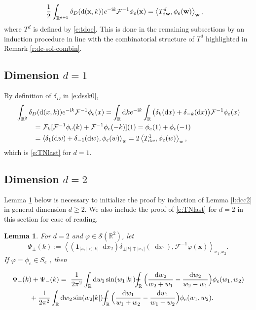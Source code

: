 \documentclass[11pt,A4,twoside]{article}
\newcommand\ind{\mathbf{1}}
\numberwithin{equation}{section}
\renewcommand{\vec}{\mathbf}
\newcommand{\intcc}{\dashint}
\newcommand{\F}{\mathcal{F}}
\newcommand{\Fi}{\mathcal{F}^{-1}}
\renewcommand*\d{\mathop{}\!\mathrm{d}}
\newcommand{\inner}[1]{\left\langle#1 \right\rangle}
\newcommand{\x}{\mathbf{x}}
\newcommand{\w}{\mathbf{w}}
\newcommand{\R}{\mathbbm{R}}
\renewcommand{\S}{\mathcal{S}}
\def\Phint#1{\mathchoice
  {\XXint\displaystyle\textstyle{#1}}%
  {\XXint\textstyle\scriptstyle{#1}}%
  {\XXint\scriptstyle\scriptscriptstyle{#1}}%
  {\XXint\scriptscriptstyle\scriptscriptstyle{#1}}%
  \!\int}
\def\XXint#1#2#3{{\setbox0=\hbox{$#1{#2#3}{\int}$}
    \vcenter{\hbox{$#2#3$}}\kern-.5\wd0}}
\def\dashint{\Phint-}
\def\qqq{\;\;\;\;\;\;\;\;\;}
\newcommand{\beqa}{\begin{eqnarray}}
\newcommand{\eeqa}{\end{eqnarray}}
\def\bal{\begin{aligned}}
\def\eal{\end{aligned}}
\def\bll#1{
\beqa\label{#1}\bal
}\def\lel{\eal\eeqa}
\newcommand{\beql}[1]{\bll{#1}}
\newcommand{\eeql}{\lel}
\newtheorem{lemma}[theorem]{Lemma}
\theoremstyle{definition}
\theoremstyle{remark}
\def\R{\mathbb{R}}
\def\varphie{\varphi_e}
\def\theS{D}
\def\thermi{{\rm i}}%
\begin{document}
{\def\varphie{\phi_e}\beql{e:TNlast}
        &\frac{1}{2}\int_{\R^{d+1}} \delta_\theS(\d(\vec x, k)) e^{-\thermi k} \Fi \varphie (\x) 
         =    \inner{T^d_{\d \w}, \varphie (\w)}_{\w},
         \eeql
where $T^d$ is defined by \eqref{e:tdoe}. 
This is done in the remaining subsections by an induction procedure in line with the combinatorial structure of $T^d$ highlighted in Remark \ref{r:dc-sol-combin}.

\subsection{Dimension $ d=1$}%


By definition of $ \delta_\theS$ in \eqref{e:dssk0},
{\def\varphie{\phi_e}\begin{align*}
    &\int_{\R^{2}} \delta_\theS(\d(  x, k)) e^{-\thermi k} \Fi \varphie ( x) 
     =  \int_{\R} \d k e^{-\thermi k}  \int_{\R}\big(\delta_{k}(\d x) + \delta_{-k}(\d x) \big)  \Fi \varphie(x)  \\
    &\qqq =\F_k[ \Fi \varphie(k) + \Fi \varphie(-k)](1) = \varphie(1) + \varphie(-1)\\
    &\qqq =\inner{\delta_1(\d w)+ \delta_{-1}(\d w),\varphie(w)}_{w} = 2\inner{T^1_{\d w}, \varphie (w)}_{w},
\end{align*}}
which is \eqref{e:TNlast} for $d=1$.



\subsection{Dimension $d=2$} 

Lemma \ref{lemma:fouri} below is necessary to initialize the proof by induction of Lemma \ref{l:dcc2} in general dimension $d\ge 2$.  We also include the proof of \eqref{e:TNlast} for $d=2$ in this section for ease of reading.

{\def\varphie{\varphi}
\def\Psie{\Psi}

\begin{lemma}\label{lemma:fouri}
    For $d=2$ and $\varphie  \in \S(\R^2)$, let
    \[
        \Psi_\pm (k) := \inner{ (\ind_{|x_2|<|k|} \d x_2) 
        \delta_{\pm|k|\mp|x_2|}(\d x_1), \F^{-1}\varphie(\x)}_{x_1,x_2}.       
    \]
    If $\varphie =\phi_e\in S_e$%
    , then
    \beql{eq:pp}
      & \Psi_+(k) + \Psi_-(k) = \ \frac{1}{2\pi^2} \int_{\R}\d w_1\sin(w_1|k|) \intcc_\R \Big(\frac{\d w_2}{w_2 + w_1}- \frac{\d w_2}{w_2 - w_1}\Big)\phi_e (w_1,w_2) 
        \\
        &\qqq + \frac{1}{2\pi^2}\int_{\R}\d w_2\sin(w_2|k|) \intcc_\R  \Big(\frac{\d w_1}{w_1 + w_2}- \frac{\d w_1}{w_1 - w_2}\Big)\phi_e(w_1,w_2) . 
    \eeql
\end{lemma}


}}
\end{document}
